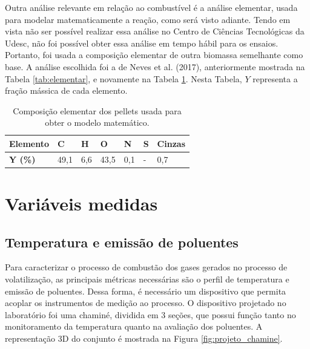 Outra análise relevante em relação ao combustível é a análise elementar, usada para modelar matematicamente a reação, como será visto adiante. Tendo em vista não ser possível realizar essa análise no Centro de Ciências Tecnológicas da Udesc, não foi possível obter essa análise em tempo hábil para os ensaios. Portanto, foi usada a composição elementar de outra biomassa semelhante como base. A análise escolhida foi a de Neves et al. (2017), anteriormente mostrada na Tabela \ref{tab:elementar}, e novamente na Tabela \ref{tab:elementar_modelagem}. Nesta Tabela, $Y$ representa a fração mássica de cada elemento. 

\begin{table}[!ht]
	\centering
	\small
	\renewcommand{\arraystretch}{1.3}
	\caption{Composição elementar dos pellets usada para obter o modelo matemático.}%
	\label{tab:elementar_modelagem}
        \begin{tabular}{|l|l|l|l|l|l|l|}
        \hline
        \textbf{Elemento} & C    & H   & O    & N   & S & Cinzas \\ \hline
        \textbf{Y (\%)}   & 49,1 & 6,6 & 43,5 & 0,1 & - & 0,7    \\ \hline
        \end{tabular}
	\vspace{2mm}
\end{table}


\section{Variáveis medidas}

\subsection{Temperatura e emissão de poluentes}
Para caracterizar o processo de combustão dos gases gerados no processo de volatilização, as principais métricas necessárias são o perfil de temperatura e emissão de poluentes. Dessa forma, é necessário um dispositivo que permita acoplar os instrumentos de medição ao processo. O dispositivo projetado no laboratório foi uma chaminé, dividida em 3 seções, que possui função tanto no monitoramento da temperatura quanto na avaliação dos poluentes. A representação 3D do conjunto é mostrada na Figura \ref{fig:projeto_chamine}.

